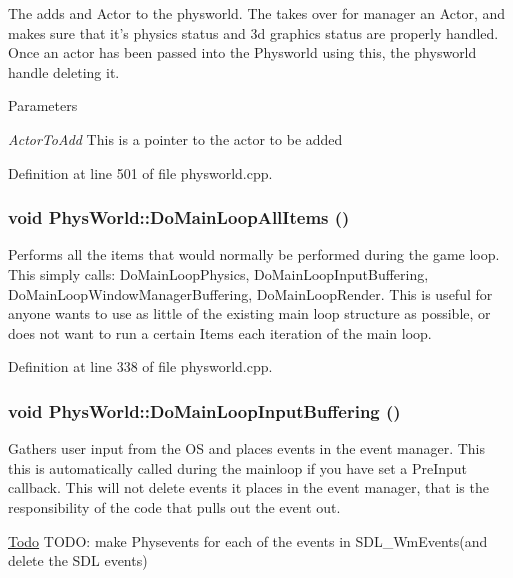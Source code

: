 The adds and Actor to the physworld. The takes over for manager an Actor, and makes sure that it's physics status and 3d graphics status are properly handled. Once an actor has been passed into the Physworld using this, the physworld handle deleting it. 
\begin{DoxyParams}{Parameters}
\item[{\em ActorToAdd}]This is a pointer to the actor to be added \end{DoxyParams}


Definition at line 501 of file physworld.cpp.\hypertarget{classPhysWorld_a60b7978b39fc347c2f37077737783da6}{
\subsubsection[{DoMainLoopAllItems}]{\setlength{\rightskip}{0pt plus 5cm}void PhysWorld::DoMainLoopAllItems ()}}
\label{db/df5/classPhysWorld_a60b7978b39fc347c2f37077737783da6}


Performs all the items that would normally be performed during the game loop. This simply calls: DoMainLoopPhysics, DoMainLoopInputBuffering, DoMainLoopWindowManagerBuffering, DoMainLoopRender. This is useful for anyone wants to use as little of the existing main loop structure as possible, or does not want to run a certain Items each iteration of the main loop. 

Definition at line 338 of file physworld.cpp.\hypertarget{classPhysWorld_a81b3f0dcc0a90d039623f696343e6e9c}{
\subsubsection[{DoMainLoopInputBuffering}]{\setlength{\rightskip}{0pt plus 5cm}void PhysWorld::DoMainLoopInputBuffering ()}}
\label{db/df5/classPhysWorld_a81b3f0dcc0a90d039623f696343e6e9c}


Gathers user input from the OS and places events in the event manager. This this is automatically called during the mainloop if you have set a PreInput callback. This will not delete events it places in the event manager, that is the responsibility of the code that pulls out the event out. 

\begin{Desc}
\item[\hyperlink{todo__todo000005}{Todo}]TODO: make Physevents for each of the events in SDL\_\-WmEvents(and delete the SDL events) \end{Desc}



